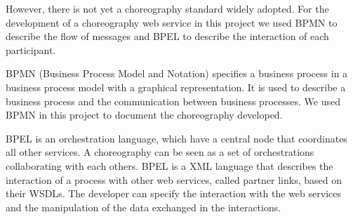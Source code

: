 However, there is not yet a choreography standard widely adopted. For the development of a choreography web service in this project we used BPMN to describe the flow of messages and BPEL to describe the interaction of each participant. 

BPMN (Business Process Model and Notation) specifies a business process in a business process model with a graphical representation. It is used to describe a business process and the communication between business processes. We used BPMN in this project to document the choreography developed.

BPEL is an orchestration language, which have a central node that coordinates all other services. A choreography can be seen as a set of orchestrations collaborating with each others. BPEL is a XML language that describes the interaction of a process with other web services, called partner links, based on their WSDLs. The developer can specify the interaction with the web services and the manipulation of the data exchanged in the interactions.


